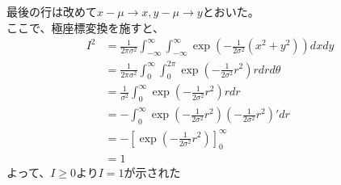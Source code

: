 \documentclass[a4j,dvipdfmx]{jsarticle}
\begin{document}
最後の行は改めて$x-\mu\rightarrow x, y-\mu\rightarrow y$とおいた。\\
ここで、極座標変換を施すと、
\begin{align*}
    I^2 &= \frac{1}{2\pi\sigma^2} \int_{-\infty}^{\infty} \int_{-\infty}^{\infty}
    \exp \left( -\frac{1}{2\sigma^2} (x^2 + y^2) \right) dxdy \\
    &= \frac{1}{2\pi\sigma^2} \int_{0}^{\infty} \int_{0}^{2\pi}
    \exp \left( -\frac{1}{2\sigma^2} r^2 \right) r drd\theta \\
    &= \frac{1}{\sigma^2} \int_{0}^{\infty} \exp \left( -\frac{1}{2\sigma^2} r^2 \right) r dr \\
    &= - \int_{0}^{\infty} \exp \left( -\frac{1}{2\sigma^2} r^2 \right) \left( -\frac{1}{2\sigma^2} r^2 \right)' dr \\
    &= - \left[ \exp \left( -\frac{1}{2\sigma^2} r^2 \right) \right]_0^{\infty} \\
    &= 1
\end{align*}
よって、$I \ge 0$より$I=1$が示された
\end{document}
